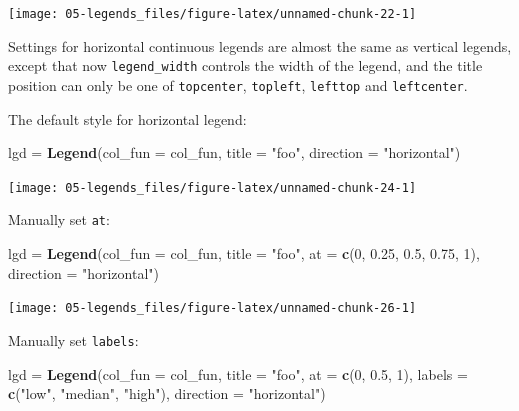 \documentclass[]{book}
\newenvironment{Shaded}{\begin{snugshade}}{\end{snugshade}}
\newcommand{\KeywordTok}[1]{\textcolor[rgb]{0.13,0.29,0.53}{\textbf{#1}}}
\newcommand{\DataTypeTok}[1]{\textcolor[rgb]{0.13,0.29,0.53}{#1}}
\newcommand{\DecValTok}[1]{\textcolor[rgb]{0.00,0.00,0.81}{#1}}
\newcommand{\FloatTok}[1]{\textcolor[rgb]{0.00,0.00,0.81}{#1}}
\newcommand{\StringTok}[1]{\textcolor[rgb]{0.31,0.60,0.02}{#1}}
\newcommand{\NormalTok}[1]{#1}
\theoremstyle{definition}
\theoremstyle{definition}
\theoremstyle{definition}
\theoremstyle{remark}
\begin{document}
\begin{center}\texttt{[image: 05-legends\_files/figure-latex/unnamed-chunk-22-1]} \end{center}

Settings for horizontal continuous legends are almost the same as
vertical legends, except that now \texttt{legend\_width} controls the
width of the legend, and the title position can only be one of
\texttt{topcenter}, \texttt{topleft}, \texttt{lefttop} and
\texttt{leftcenter}.

The default style for horizontal legend:

\begin{Shaded}
\begin{Highlighting}[]
\NormalTok{lgd =}\StringTok{ }\KeywordTok{Legend}\NormalTok{(}\DataTypeTok{col_fun =}\NormalTok{ col_fun, }\DataTypeTok{title =} \StringTok{"foo"}\NormalTok{, }\DataTypeTok{direction =} \StringTok{"horizontal"}\NormalTok{)}
\end{Highlighting}
\end{Shaded}

\begin{center}\texttt{[image: 05-legends\_files/figure-latex/unnamed-chunk-24-1]} \end{center}

Manually set \texttt{at}:

\begin{Shaded}
\begin{Highlighting}[]
\NormalTok{lgd =}\StringTok{ }\KeywordTok{Legend}\NormalTok{(}\DataTypeTok{col_fun =}\NormalTok{ col_fun, }\DataTypeTok{title =} \StringTok{"foo"}\NormalTok{, }\DataTypeTok{at =} \KeywordTok{c}\NormalTok{(}\DecValTok{0}\NormalTok{, }\FloatTok{0.25}\NormalTok{, }\FloatTok{0.5}\NormalTok{, }\FloatTok{0.75}\NormalTok{, }\DecValTok{1}\NormalTok{), }
    \DataTypeTok{direction =} \StringTok{"horizontal"}\NormalTok{)}
\end{Highlighting}
\end{Shaded}

\begin{center}\texttt{[image: 05-legends\_files/figure-latex/unnamed-chunk-26-1]} \end{center}

Manually set \texttt{labels}:

\begin{Shaded}
\begin{Highlighting}[]
\NormalTok{lgd =}\StringTok{ }\KeywordTok{Legend}\NormalTok{(}\DataTypeTok{col_fun =}\NormalTok{ col_fun, }\DataTypeTok{title =} \StringTok{"foo"}\NormalTok{, }\DataTypeTok{at =} \KeywordTok{c}\NormalTok{(}\DecValTok{0}\NormalTok{, }\FloatTok{0.5}\NormalTok{, }\DecValTok{1}\NormalTok{), }
    \DataTypeTok{labels =} \KeywordTok{c}\NormalTok{(}\StringTok{"low"}\NormalTok{, }\StringTok{"median"}\NormalTok{, }\StringTok{"high"}\NormalTok{), }\DataTypeTok{direction =} \StringTok{"horizontal"}\NormalTok{)}
\end{Highlighting}
\end{Shaded}
\end{document}
